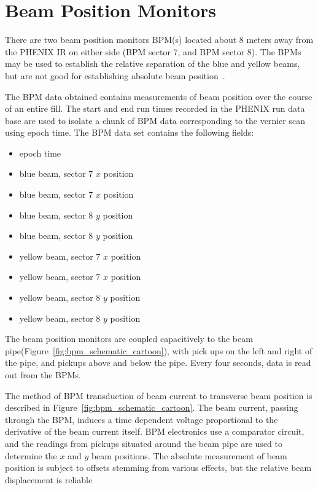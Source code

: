 \section{Beam Position Monitors}
\label{sec:beam_position_monitoring}
There are two beam position monitors BPM(s) located about 8 meters away from the
PHENIX IR on either side (BPM sector 7, and BPM sector 8). The BPMs may be used
to establish the relative separation of the blue and yellow beams, but are not
good for establishing absolute beam position~\cite{Drees2013}.  

The BPM data obtained contains measurements of beam position over the course of
an entire fill. The start and end run times recorded in the PHENIX run data
base are used to isolate a chunk of BPM data corresponding to the vernier scan
using epoch time. The BPM data set contains the following fields:
\begin{itemize}
\item epoch time
\item blue beam, sector 7 $x$ position
\item blue beam, sector 7 $x$ position
\item blue beam, sector 8 $y$ position
\item blue beam, sector 8 $y$ position
\item yellow beam, sector 7 $x$ position
\item yellow beam, sector 7 $x$ position
\item yellow beam, sector 8 $y$ position
\item yellow beam, sector 8 $y$ position
\end{itemize}

The beam position monitors are coupled capacitively to the beam
pipe(Figure~\ref{fig:bpm_schematic_cartoon}), with pick ups on the left and
right of the pipe, and pickups above and below the pipe. Every four seconds,
data is read out from the BPMs. 

The method of BPM transduction of beam current to transverse beam position is
described in Figure~\ref{fig:bpm_schematic_cartoon}. The beam current, passing
through the BPM,  induces a time dependent voltage proportional to the
derivative of the beam current itself. BPM electronics use a comparator circuit,
and the readings from pickups situated around the beam pipe are used to
determine the $x$ and $y$ beam positions. The absolute measurement of beam
position is subject to offsets stemming from various effects, but the relative
beam displacement is reliable~\cite{KawallFocus2004}

